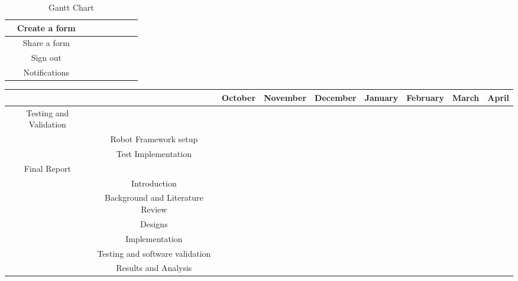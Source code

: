 \begin{sidewaystable}[h]
\begin{tabular}{|c|c|c|c|c|c|c|c|c|}
            \hline
            & Create a form & & & & \cellcolor{lightgray} & & & \\
            \hline
            & Share a form & & & & \cellcolor{lightgray} & & & \\
            \hline
            & Sign out & & & & \cellcolor{lightgray} & \cellcolor{lightgray} & & \\
            \hline
            & Notifications & & & & & \cellcolor{lightgray} & & \\
            \hline
        \end{tabular}
        \caption{Gantt Chart}
    \end{sidewaystable}

    \pagebreak

    \begin{sidewaystable}[h]
        \centering
        \begin{tabular}{|c|c|c|c|c|c|c|c|c|}
            \hline
            & & October & November & December & January & February & March & April\\
            \hline
            \hline
            Testing and Validation & & & & & \cellcolor{gray} & \cellcolor{gray} & & \\
            \hline
             & Robot Framework setup & & & & \cellcolor{lightgray} & & & \\
            \hline
             & Test Implementation & & & & \cellcolor{lightgray} & \cellcolor{lightgray} & & \\
            \hline
            Final Report & & & & & \cellcolor{gray} & \cellcolor{gray} & \cellcolor{gray} & \cellcolor{gray}\\
            \hline
             & Introduction & & & & \cellcolor{lightgray} & & & \\
            \hline
             & Background and Literature Review & & & & \cellcolor{lightgray} & & & \\
            \hline
             & Designs & & & & \cellcolor{lightgray} & & & \\
            \hline
             & Implementation & & & & \cellcolor{lightgray} & \cellcolor{lightgray} & & \\
            \hline
             & Testing and software validation & & & & & \cellcolor{lightgray} & \cellcolor{lightgray} & \\
            \hline
             & Results and Analysis & & & & & \cellcolor{lightgray} & \cellcolor{lightgray} & \\

\end{tabular}
\end{sidewaystable}
